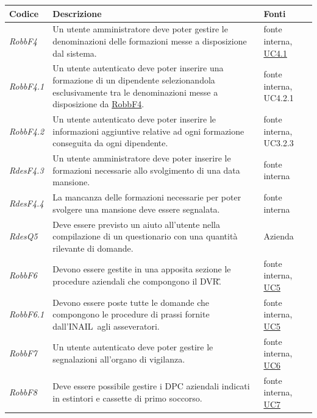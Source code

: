 \begin{flushleft}
	\begin{tabular}{|l{2cm}|l{8cm}|l{2cm}|}
		\hline
		\textbf{Codice} & \textbf{Descrizione} & \textbf{Fonti} \\
		\hline
		\label{RobbF4}
		\textit{RobbF4} & Un utente amministratore deve poter gestire le denominazioni delle formazioni messe a disposizione dal sistema. &  fonte interna, \hyperref[section:UC4_1]{UC4.1}\\
		\hline
		\label{RobbF4.1}
		\textit{RobbF4.1} & Un utente autenticato deve poter inserire una formazione di un dipendente selezionandola esclusivamente tra le denominazioni messe a disposizione da \hyperref[RobbF4]{RobbF4}. &  fonte interna, UC4.2.1 \\
		\hline
		\label{RobbF4.2}
		\textit{RobbF4.2} & Un utente autenticato deve poter inserire le informazioni aggiuntive relative ad ogni formazione conseguita da ogni dipendente. & fonte interna, UC3.2.3\\
		\hline
		\label{RdesF4.3}
		\textit{RdesF4.3} & Un utente amministratore deve poter inserire le formazioni necessarie allo svolgimento di una data mansione. & fonte interna \\
		\hline
		\label{RdesF4.4}
		\textit{RdesF4.4} & La mancanza delle formazioni necessarie per poter svolgere una mansione deve essere segnalata. & fonte interna \\
		\hline
		\label{RobbQ5}
		\textit{RdesQ5} & Deve essere previsto un aiuto all'utente nella compilazione di un  questionario con una quantità rilevante di domande. & Azienda \\
		\hline
		\label{RobbF6}
		\textit{RobbF6} & Devono essere gestite in una apposita sezione le procedure aziendali che compongono il \gls{DVR}\G. & fonte interna, \hyperref[section:UC5]{UC5}\\
		\hline
		\label{RobbF6.1}
		\textit{RobbF6.1} & Devono essere poste tutte le domande che compongono le procedure di prassi fornite dall'\gls{INAIL}\ agli asseveratori. &  fonte interna, \hyperref[section:UC5]{UC5}\\
		\hline
		\label{RdesF7}
		\textit{RobbF7} & Un utente autenticato deve poter gestire le segnalazioni all'organo di vigilanza. & fonte interna,  \hyperref[section:UC6]{UC6}\\
		\hline
		\label{RobbF8}
		\textit{RobbF8} & Deve essere possibile gestire i  \gls{DPC} aziendali indicati in estintori e cassette di primo soccorso. & fonte interna, \hyperref[section:UC7]{UC7}\\

\end{tabular}
\end{flushleft}
